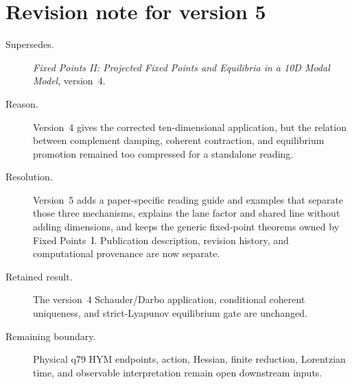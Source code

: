 \documentclass[11pt]{article}
\begin{document}
\section*{Revision note for version 5}
\begin{description}
\item[Supersedes.] \emph{Fixed Points II: Projected Fixed Points and
Equilibria in a 10D Modal Model}, version~4.
\item[Reason.] Version~4 gives the corrected ten-dimensional application, but
the relation between complement damping, coherent contraction, and
equilibrium promotion remained too compressed for a standalone reading.
\item[Resolution.] Version~5 adds a paper-specific reading guide and examples
that separate those three mechanisms, explains the lane factor and shared
line without adding dimensions, and keeps the generic fixed-point theorems
owned by Fixed Points~I. Publication description, revision history, and
computational provenance are now separate.
\item[Retained result.] The version~4 Schauder/Darbo application, conditional
coherent uniqueness, and strict-Lyapunov equilibrium gate are unchanged.
\item[Remaining boundary.] Physical q79 HYM endpoints, action, Hessian,
finite reduction, Lorentzian time, and observable interpretation remain open
downstream inputs.
\end{description}
\end{document}
